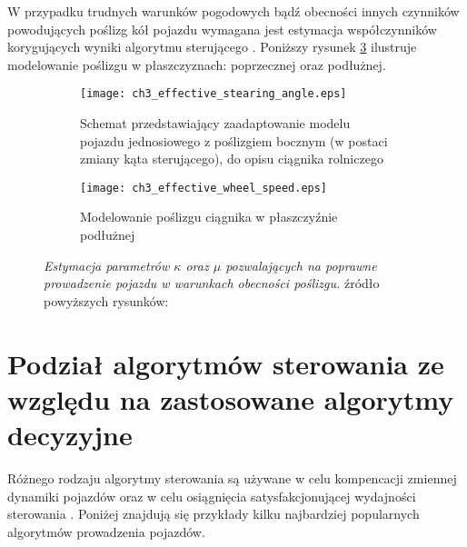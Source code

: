 \indent W przypadku trudnych warunków pogodowych bądź obecności innych czynników powodujących poślizg kół pojazdu wymagana 
jest estymacja współczynników korygujących wyniki algorytmu sterującego \cite[]{KRAUS}. Poniższy rysunek \ref{fig:side_forward_slip} ilustruje modelowanie 
poślizgu w płaszczyznach: poprzecznej oraz podłużnej.

\begin{figure}[H]
\centering
\begin{subfigure}{.4\textwidth}
  \centering
  \texttt{[image: ch3\_effective\_stearing\_angle.eps]}
  \caption{Schemat przedstawiający zaadaptowanie modelu pojazdu jednosiowego z poślizgiem bocznym (w postaci zmiany kąta sterującego), do opisu ciągnika rolniczego}
  \label{fig:side_slip}
\end{subfigure}
\hspace{2cm}
\begin{subfigure}{.4\textwidth}
  \centering
  \texttt{[image: ch3\_effective\_wheel\_speed.eps]}
  \caption{Modelowanie poślizgu ciągnika w płaszczyźnie podłużnej}
  \label{fig:longitudinal_slip}
\end{subfigure}
\caption{\textit{Estymacja parametrów $\kappa$ oraz $\mu$ pozwalających na poprawne prowadzenie pojazdu w warunkach obecności poślizgu.}
źródło powyższych rysunków: \cite[][strona 26]{KRAUS}}
\label{fig:side_forward_slip}
\end{figure}

\section{Podział algorytmów sterowania ze względu na zastosowane algorytmy decyzyjne}
Różnego rodzaju algorytmy sterowania są używane w celu kompencacji zmiennej dynamiki pojazdów oraz w celu osiągnięcia satysfakcjonującej wydajności sterowania
 \cite[][strona 770]{CCTA_769_775}. Poniżej znajdują się przykłady kilku najbardziej popularnych algorytmów prowadzenia pojazdów.

